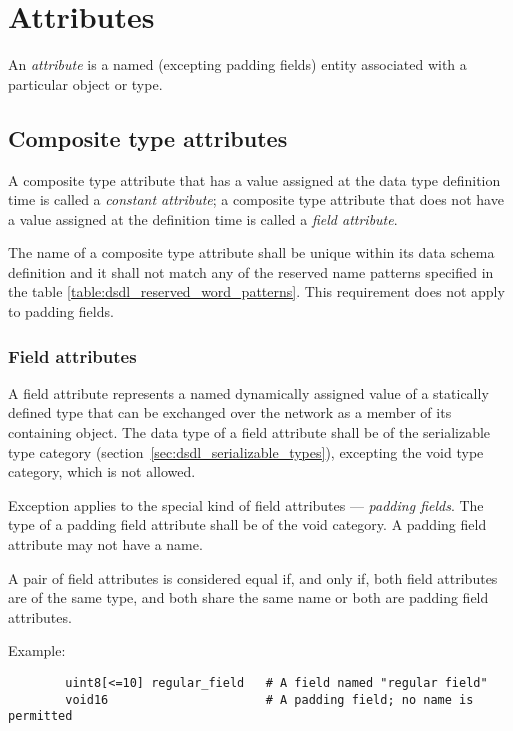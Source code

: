 \section{Attributes}\label{sec:dsdl_attributes}

An \emph{attribute} is a named (excepting padding fields) entity associated with a particular object or type.

\subsection{Composite type attributes}

A composite type attribute that has a value assigned at the data type definition time is called a
\emph{constant attribute};
a composite type attribute that does not have a value assigned at the definition time is called a
\emph{field attribute}.

The name of a composite type attribute shall be unique within its data schema definition
and it shall not match any of the reserved name patterns specified in the table
\ref{table:dsdl_reserved_word_patterns}.
This requirement does not apply to padding fields.

\subsubsection{Field attributes}

A field attribute represents a named dynamically assigned value of a statically defined type
that can be exchanged over the network as a member of its containing object.
The data type of a field attribute shall be of the serializable type category
(section~\ref{sec:dsdl_serializable_types}),
excepting the void type category, which is not allowed.

Exception applies to the special kind of field attributes --- \emph{padding fields}.
The type of a padding field attribute shall be of the void category.
A padding field attribute may not have a name.

A pair of field attributes is considered equal if, and only if, both field attributes are of the same type,
and both share the same name or both are padding field attributes.

\begin{remark}
    Example:
    \begin{verbatim}
        uint8[<=10] regular_field   # A field named "regular field"
        void16                      # A padding field; no name is permitted
    \end{verbatim}
\end{remark}

